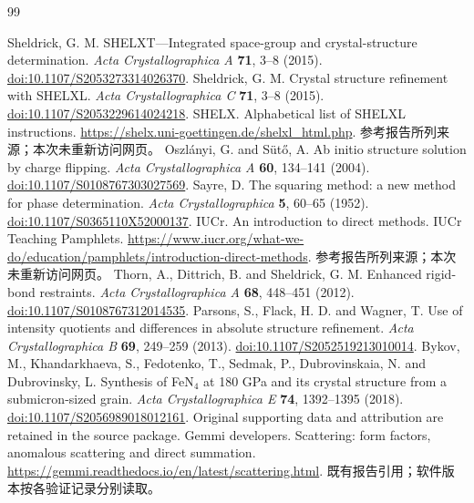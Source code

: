 \begin{thebibliography}{99}
\latinfont
{} Sheldrick, G. M. SHELXT---Integrated space-group and crystal-structure determination. \textit{Acta Crystallographica A} \textbf{71}, 3--8 (2015). \href{https://doi.org/10.1107/S2053273314026370}{doi:10.1107/S2053273314026370}.
 Sheldrick, G. M. Crystal structure refinement with SHELXL. \textit{Acta Crystallographica C} \textbf{71}, 3--8 (2015). \href{https://doi.org/10.1107/S2053229614024218}{doi:10.1107/S2053229614024218}.
 SHELX. Alphabetical list of SHELXL instructions. \url{https://shelx.uni-goettingen.de/shelxl_html.php}. 参考报告所列来源；本次未重新访问网页。
 Oszl\'anyi, G. and S\"ut\H{o}, A. Ab initio structure solution by charge flipping. \textit{Acta Crystallographica A} \textbf{60}, 134--141 (2004). \href{https://doi.org/10.1107/S0108767303027569}{doi:10.1107/S0108767303027569}.
 Sayre, D. The squaring method: a new method for phase determination. \textit{Acta Crystallographica} \textbf{5}, 60--65 (1952). \href{https://doi.org/10.1107/S0365110X52000137}{doi:10.1107/S0365110X52000137}.
 IUCr. An introduction to direct methods. IUCr Teaching Pamphlets. \url{https://www.iucr.org/what-we-do/education/pamphlets/introduction-direct-methods}. 参考报告所列来源；本次未重新访问网页。
 Thorn, A., Dittrich, B. and Sheldrick, G. M. Enhanced rigid-bond restraints. \textit{Acta Crystallographica A} \textbf{68}, 448--451 (2012). \href{https://doi.org/10.1107/S0108767312014535}{doi:10.1107/S0108767312014535}.
 Parsons, S., Flack, H. D. and Wagner, T. Use of intensity quotients and differences in absolute structure refinement. \textit{Acta Crystallographica B} \textbf{69}, 249--259 (2013). \href{https://doi.org/10.1107/S2052519213010014}{doi:10.1107/S2052519213010014}.
 Bykov, M., Khandarkhaeva, S., Fedotenko, T., Sedmak, P., Dubrovinskaia, N. and Dubrovinsky, L. Synthesis of FeN$_4$ at 180 GPa and its crystal structure from a submicron-sized grain. \textit{Acta Crystallographica E} \textbf{74}, 1392--1395 (2018). \href{https://doi.org/10.1107/S2056989018012161}{doi:10.1107/S2056989018012161}. Original supporting data and attribution are retained in the source package.
 Gemmi developers. Scattering: form factors, anomalous scattering and direct summation. \url{https://gemmi.readthedocs.io/en/latest/scattering.html}. 既有报告引用；软件版本按各验证记录分别读取。

\end{thebibliography}

